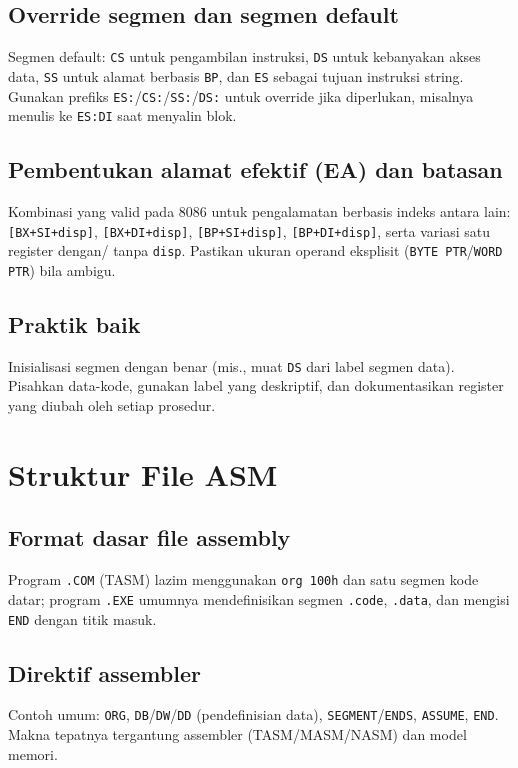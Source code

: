 \subsection{Override segmen dan segmen default}
Segmen default: \texttt{CS} untuk pengambilan instruksi, \texttt{DS} untuk kebanyakan akses data, \texttt{SS} untuk alamat berbasis \texttt{BP}, dan \texttt{ES} sebagai tujuan instruksi string. Gunakan prefiks \texttt{ES:}/\texttt{CS:}/\texttt{SS:}/\texttt{DS:} untuk override jika diperlukan, misalnya menulis ke \texttt{ES:DI} saat menyalin blok. \cite{intel2019manual32}

\subsection{Pembentukan alamat efektif (EA) dan batasan}
Kombinasi yang valid pada 8086 untuk pengalamatan berbasis indeks antara lain: \texttt{[BX+SI+disp]}, \texttt{[BX+DI+disp]}, \texttt{[BP+SI+disp]}, \texttt{[BP+DI+disp]}, serta variasi satu register dengan/ tanpa \texttt{disp}. Pastikan ukuran operand eksplisit (\texttt{BYTE PTR}/\texttt{WORD PTR}) bila ambigu. \cite{intel2019manual32}

\subsection{Praktik baik}
Inisialisasi segmen dengan benar (mis., muat \texttt{DS} dari label segmen data). Pisahkan data-kode, gunakan label yang deskriptif, dan dokumentasikan register yang diubah oleh setiap prosedur.

\section{Struktur File ASM}
\subsection{Format dasar file assembly}
Program \texttt{.COM} (TASM) lazim menggunakan \texttt{org 100h} dan satu segmen kode datar; program \texttt{.EXE} umumnya mendefinisikan segmen \texttt{.code}, \texttt{.data}, dan mengisi \texttt{END} dengan titik masuk.

\subsection{Direktif assembler}
Contoh umum: \texttt{ORG}, \texttt{DB}/\texttt{DW}/\texttt{DD} (pendefinisian data), \texttt{SEGMENT}/\texttt{ENDS}, \texttt{ASSUME}, \texttt{END}. Makna tepatnya tergantung assembler (TASM/MASM/NASM) dan model memori.

